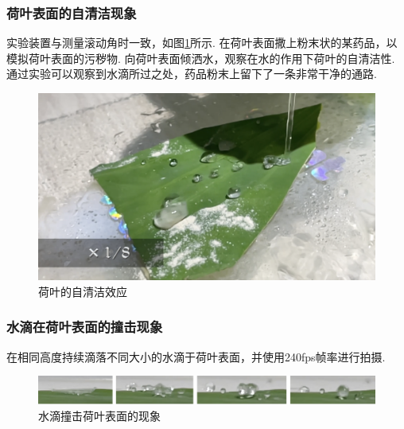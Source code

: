 \documentclass[a4paper,12pt]{article}%
\begin{document}
\subsubsection{荷叶表面的自清洁现象}
\begin{spacing}{1.528}%
实验装置与测量滚动角时一致，如图\ref{自清洁现象}所示. 在荷叶表面撒上粉末状的某药品，以模拟荷叶表面的污秽物. 向荷叶表面倾洒水，观察在水的作用下荷叶的自清洁性. 
通过实验可以观察到水滴所过之处，药品粉末上留下了一条非常干净的通路. 
\end{spacing}
\begin{figure}[H]
    \centering
    \includegraphics[scale=0.3]{图像/自清洁.png}
    \caption{荷叶的自清洁效应}\label{自清洁现象}
\end{figure}

\subsubsection{水滴在荷叶表面的撞击现象}
在相同高度持续滴落不同大小的水滴于荷叶表面，并使用240fps帧率进行拍摄. 
\begin{figure}[H]
    \centering
    \includegraphics[scale=0.27]{图像/撞击.png}
    \caption{水滴撞击荷叶表面的现象}\label{撞击现象}
\end{figure}
\end{document}
